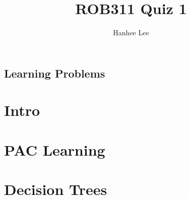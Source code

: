 \documentclass{article}
\title{ROB311 Quiz 1}
\author{Hanhee Lee}
\begin{document}
\maketitle

\tableofcontents
\newpage

\begin{center}
    \section*{Learning Problems}
\end{center}

\section{Intro}

\newpage

\section{PAC Learning}

\newpage

\section{Decision Trees}

\end{document}
